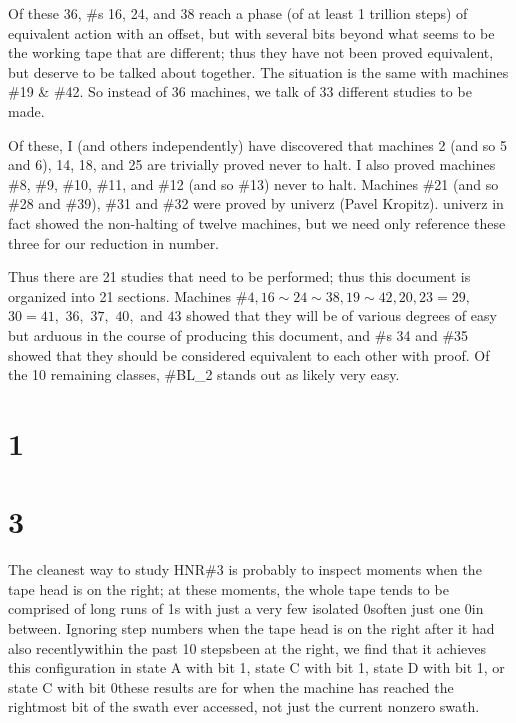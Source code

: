 \documentclass[12pt]{article}
\begin{document}
Of these 36, \#s 16, 24, and 38 reach a phase (of at least 1 trillion steps) of equivalent action with an offset, but with several bits beyond what seems to be the working tape that are different; thus they have not been proved equivalent, but deserve to be talked about together. The situation is the same with machines \#19 \& \#42. So instead of 36 machines, we talk of 33 different studies to be made.

Of these, I (and others independently) have discovered that machines 2 (and so 5 and 6), 14, 18, and 25 are trivially proved never to halt. I also proved machines \#8, \#9, \#10, \#11, and \#12 (and so \#13) never to halt. Machines \#21 (and so \#28 and \#39), \#31 and \#32 were proved by univerz (Pavel Kropitz). univerz in fact showed the non-halting of twelve machines, but we need only reference these three for our reduction in number.

Thus there are 21 studies that need to be performed; thus this document is organized into 21 sections.
Machines \#$4, 16\sim24\sim38, 19\sim42, 20, 23=29,$ $30=41,$ $36,$ $37,$ $40,$ and $43$
showed that they will be of various degrees of easy but arduous in the course of producing this document,
and \#s 34 and \#35 showed that they should be considered equivalent to each other with proof.
Of the 10 remaining classes, \#BL\_2 stands out as likely very easy.


\newpage
\tableofcontents
\clearpage
{}
{}
\section*{1}
\clearpage
{}
{}
\section*{3}
The cleanest way to study HNR\#3 is probably to inspect moments when the tape head is on the right; at these moments, the whole tape tends to be comprised of long runs of 1s with just a very few isolated 0s\textemdash often just one 0\textemdash in between. Ignoring step numbers when the tape head is on the right after it had also recently\textemdash within the past 10 steps\textemdash been at the right, we find that it achieves this configuration in state A with bit 1, state C with bit 1, state D with bit 1, or state C with bit 0\textemdash these results are for when the machine has reached the rightmost bit of the swath ever accessed, not just the current nonzero swath.
\end{document}
